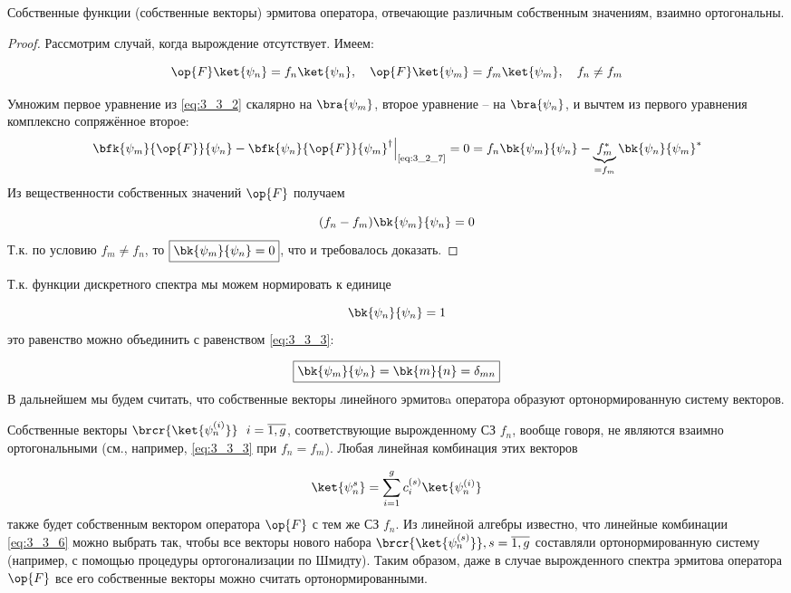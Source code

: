 \begin{stmt}
Собственные функции (собственные векторы) эрмитова оператора, отвечающие различным собственным значениям, взаимно ортогональны.
\end{stmt}
%
\begin{proof}

Рассмотрим случай, когда вырождение отсутствует. Имеем:

\begin{equation}
  \label{eq:3_3_2}
	\op{F}\ket{\psi_n} = f_n \ket{\psi_n},~~~
  \op{F}\ket{\psi_m} = f_m \ket{\psi_m},~~~
  f_n \neq f_m
\end{equation}

Умножим первое уравнение из \eqref{eq:3_3_2} скалярно на $\bra{\psi_m}$, второе уравнение -- на $\bra{\psi_n}$, и вычтем из первого уравнения комплексно сопряжённое второе:
$$
\left.
  \bfk{\psi_m}{\op{F}}{\psi_n} - \bfk{\psi_n}{\op{F}}{\psi_m}^\dag
      \right|_{\text{\eqref{eq:3_2_7}}} = 0 =
  f_n \bk{\psi_m}{\psi_n} - \underbrace{f_m^*}_{= f_m} \bk{\psi_n}{\psi_m}^*
$$%
%
Из вещественности собственных значений $\op{F}$ получаем

\begin{equation}
\label{eq:3_3_3}
(f_n - f_m) \bk{\psi_m}{\psi_n} = 0
\end{equation}%
%
Т.к. по условию $f_m \neq f_n$, то $\boxed{\bk{\psi_m}{\psi_n} = 0}$, что и требовалось доказать.
\end{proof}

Т.к. функции дискретного спектра мы можем нормировать к единице

\begin{equation}
\label{eq:3_3_4}
\bk{\psi_n}{\psi_n} = 1
\end{equation}%
%
это равенство можно объединить с равенством \eqref{eq:3_3_3}:

\begin{equation}
\label{eq:3_3_5}
\boxed{
	\bk{\psi_m}{\psi_n} = \bk{m}{n} = \delta_{mn}
}
\end{equation}%
%
В дальнейшем мы будем считать, что собственные векторы линейного эрмитовa оператора образуют ортонормированную систему векторов.

Собственные векторы $\brcr{\ket{\psi_n^{(i)}}} ~~ i = \overline{1,g}$, соответствующие вырожденному СЗ $f_n$, вообще говоря, не являются взаимно ортогональными (см., например, \eqref{eq:3_3_3} при $f_n = f_m$). Любая линейная комбинация этих векторов

\begin{equation}
\label{eq:3_3_6}
\ket{\psi_n^s} = \sum_{i=1}^{g} c_i^{(s)} \ket{\psi_n^{(i)}}
\end{equation}%
%
также будет собственным вектором оператора $\op{F}$ с тем же СЗ $f_n$. Из линейной алгебры известно, что линейные комбинации \eqref{eq:3_3_6} можно выбрать так, чтобы все векторы нового набора $\brcr{\ket{\psi_n^{(s)}}}, s = \overline{1,g}$ составляли ортонормированную систему (например, с помощью процедуры ортогонализации по Шмидту). Таким образом, даже в случае вырожденного спектра эрмитова оператора $\op{F}$ все его собственные векторы можно считать ортонормированными.

